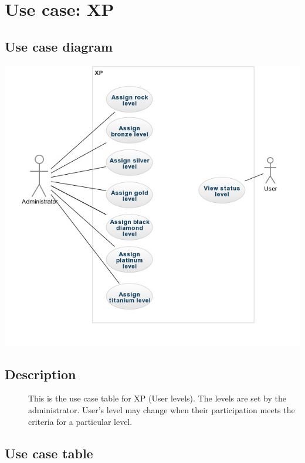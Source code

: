 \documentclass{article}
\begin{document}
\section{Use case: XP}
	\subsection{Use case diagram}
\includegraphics[width=\textwidth]{Use_Case_XP.jpg}
	\subsection{Description}
	\begin{description}
		\item[] This is the use case table for XP (User levels). The levels are set by the administrator. User's level may change when their participation meets the criteria for a particular level.  
	\end{description}
	\subsection{Use case table}
\end{document}
